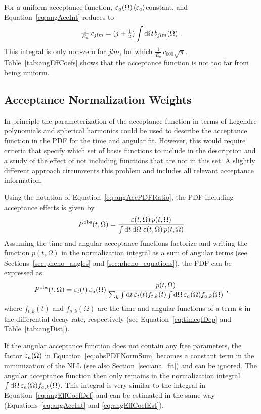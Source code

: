 For a uniform acceptance function, $\varepsilon_a(\Omega)$\texteq$\langle\varepsilon_a\rangle$\texteq constant, and Equation~\ref{eq:angAccInt} reduces to
\begin{equation}
  \tfrac{1}{E_a}\, c_{jlm} = (j+\tfrac{1}{2}) \int\mathrm{d}\Omega\,b_{jlm}(\Omega)\ .
\end{equation}
This integral is only non-zero for $j$\texteq$l$\texteq$m$, for which $\tfrac{1}{E_a}\,c_{000}$$\sqrt{\pi}$.
Table~\ref{tab:angEffCoefs} shows that the acceptance function is not too far from being uniform.


\subsection{Acceptance Normalization Weights}
\label{subsec:ana_angles_weights}

In principle the parameterization of the acceptance function in terms of Legendre polynomials and spherical harmonics could be used to
describe the acceptance function in the PDF for the time and angular fit. However, this would require criteria that specify which set of
basis functions to include in the description and a study of the effect of not including functions that are not in this set. A slightly
different approach circumvents this problem and includes all relevant acceptance information.

Using the notation of Equation~\ref{eq:angAccPDFRatio}, the PDF including acceptance effects is given by
\begin{equation}
  \label{eq:obsPDF}
  P^\text{obs}(t,\Omega) = \frac{\varepsilon(t,\Omega)\, p(t,\Omega)}{\int\mathrm{d} t\, \mathrm{d}\Omega\; \varepsilon(t,\Omega)\, p(t,\Omega)}
\end{equation}
Assuming the time and angular acceptance functions factorize and writing the function $p(t,\Omega)$ in the normalization integral as a sum
of angular terms (see Sections~\ref{sec:pheno_angles} and \ref{sec:pheno_equations}), the PDF can be expressed as
\begin{equation}
  \label{eq:obsPDFNormSum}
  P^\text{obs}(t,\Omega) = \efft\,\effa\, \frac{p(t,\Omega)}{\sum_k \int\ud t\, \efft f_{t,k}(t) \int\ud\Omega\, \effa f_{a,k}(\Omega)}\ ,
\end{equation}
where $f_{t,k}(t)$ and $f_{a,k}(\Omega)$ are the time and angular functions of a term $k$ in the differential decay rate, respectively (see
Equation~\ref{eq:timeqfDep} and Table~\ref{tab:angDist}).

If the angular acceptance function does not contain any free parameters, the factor $\varepsilon_a(\Omega)$ in Equation~\ref{eq:obsPDFNormSum} becomes a
constant term in the minimization of the NLL (see also Section~\ref{sec:ana_fit}) and can be ignored. The angular acceptance function then
only remains in the normalization integral $\int\mathrm{d}\Omega\, \varepsilon_a(\Omega) f_{a,k}(\Omega)$. This integral is very similar to the integral in
Equation~\ref{eq:angEffCoefDef} and can be estimated in the same way (Equations~\ref{eq:angAccInt} and \ref{eq:angEffCoefEst}).

